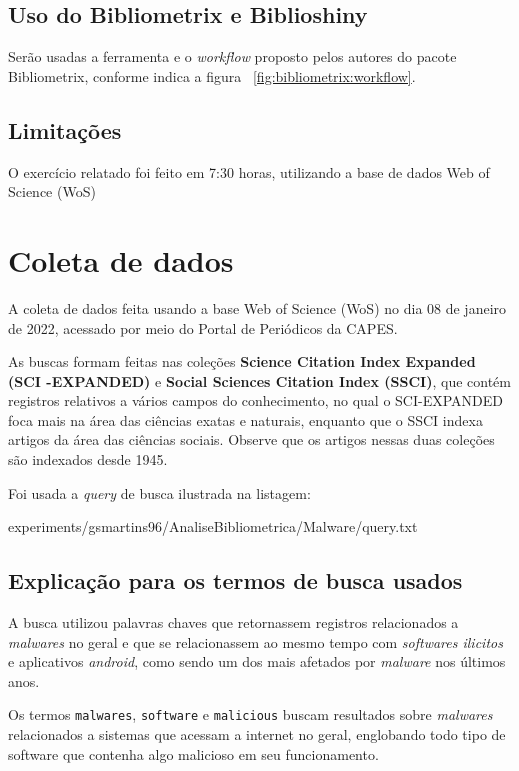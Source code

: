 \subsection{Uso do Bibliometrix e Biblioshiny}
Serão usadas a ferramenta e o \textit{workflow} proposto pelos autores do pacote Bibliometrix, conforme indica a figura ~\ref{fig:bibliometrix:workflow}.

\subsection{Limitações} O exercício relatado foi feito em 7:30 horas, utilizando a base de dados Web of Science (WoS)

\section{Coleta de dados\label{MASSA:coleta}}

A coleta de dados feita usando a base Web of Science (WoS) no dia 08 de janeiro de 2022, acessado por meio do Portal de Periódicos da CAPES.

As buscas formam feitas nas coleções \textbf{Science  Citation  Index  Expanded (SCI -EXPANDED)} e \textbf{Social  Sciences  Citation  Index (SSCI)}, que contém registros relativos a vários campos do conhecimento, no qual o SCI-EXPANDED foca mais na área das ciências exatas e naturais, enquanto que o SSCI indexa artigos da área das ciências sociais. Observe que os artigos nessas duas coleções são indexados desde 1945. 

Foi usada a \textit{query} de busca ilustrada na listagem:


{experiments/gsmartins96/AnaliseBibliometrica/Malware/query.txt}

\subsection{Explicação para os termos de busca usados\label{sec:titofrota:query}}

A busca utilizou palavras chaves que retornassem registros relacionados a \textit{malwares} no geral e que se relacionassem ao mesmo tempo com \textit{softwares ilicitos} e aplicativos \textit{android}, como sendo um dos mais afetados por \textit{malware} nos últimos anos. 

Os termos \texttt{malwares}, \texttt{software} e \texttt{malicious} buscam resultados sobre \textit{malwares} relacionados a sistemas que acessam a internet no geral, englobando todo tipo de software que contenha algo malicioso em seu funcionamento.

